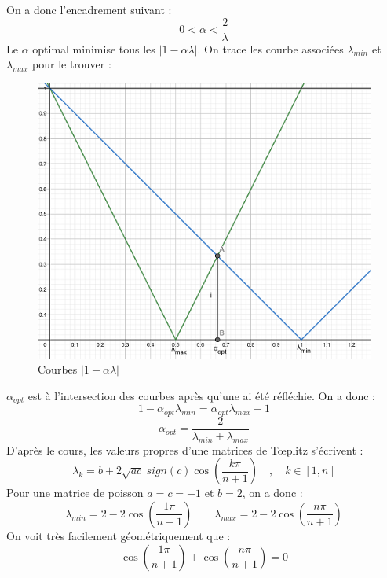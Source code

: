 \documentclass{article}
\begin{document}
On a donc l'encadrement suivant :
\[
	0 < \alpha < \frac{2}{\lambda}
\]
Le $\alpha$ optimal minimise tous les $\left| 1 - \alpha \lambda \right|$. On trace les courbe associées $\lambda_{min}$ et $\lambda_{max}$ pour le trouver :
\begin{figure}[H]
\caption{Courbes $\left| 1 - \alpha \lambda \right|$}
\centering
\includegraphics[scale=0.70]{alpha_opt}
\end{figure}
$\alpha_{opt}$ est à l'intersection des courbes après qu'une ai été réfléchie. On a donc :
\[
	1 - \alpha_{opt} \lambda_{min} = \alpha_{opt} \lambda_{max} - 1
\]
\[
	\alpha_{opt} = \frac{2}{\lambda_{min} + \lambda_{max}}
\]
D'après le cours, les valeurs propres d'une matrices de T\oe{}plitz s'écrivent :
\[
\lambda_k=b+2\sqrt{ac}\ sign(c)\cos(\frac{k\pi}{n+1}) \quad , \quad k \in \left[ 1, n \right]
\]
Pour une matrice de poisson $a=c=-1$ et $b=2$, on a donc :
\[
	\lambda_{min} = 2 - 2\cos(\frac{1\pi}{n+1}) \qquad \lambda_{max} = 2 - 2\cos(\frac{n\pi}{n+1})
\]
On voit très facilement géométriquement que :
\[
	\cos(\frac{1\pi}{n+1}) + \cos(\frac{n\pi}{n+1}) = 0
\]
\end{document}
